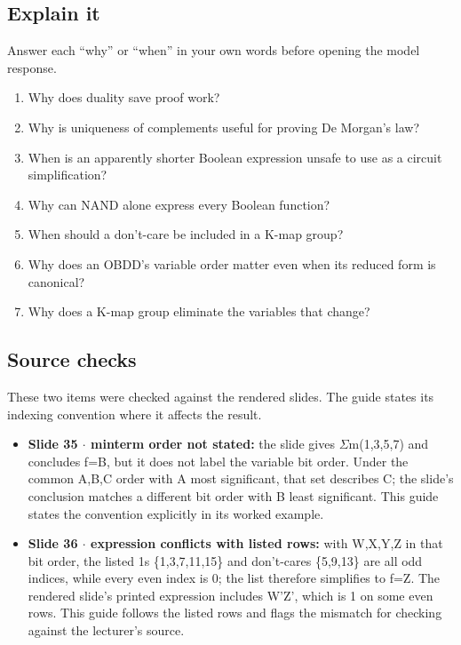 \documentclass[11pt]{article}
\begin{document}
\begin{keepsection}
\section{Explain it}

Answer each “why” or “when” in your own words before opening the model response.

\begin{enumerate}
\item Why does duality save proof work?
\item Why is uniqueness of complements useful for proving De Morgan’s law?
\item When is an apparently shorter Boolean expression unsafe to use as a circuit simplification?
\item Why can NAND alone express every Boolean function?
\item When should a don’t-care be included in a K-map group?
\item Why does an OBDD’s variable order matter even when its reduced form is canonical?
\item Why does a K-map group eliminate the variables that change?
\end{enumerate}

\end{keepsection}

\begin{keepsection}
\section{Source checks}

These two items were checked against the rendered slides. The guide states its indexing convention where it affects the result.

\begin{itemize}
\item \textbf{Slide 35 \ensuremath{\cdot} minterm order not stated:} the slide gives \ensuremath{\Sigma}m(1,3,5,7) and concludes f=B, but it does not label the variable bit order. Under the common A,B,C order with A most significant, that set describes C; the slide’s conclusion matches a different bit order with B least significant. This guide states the convention explicitly in its worked example.
\item \textbf{Slide 36 \ensuremath{\cdot} expression conflicts with listed rows:} with W,X,Y,Z in that bit order, the listed 1s \{1,3,7,11,15\} and don’t-cares \{5,9,13\} are all odd indices, while every even index is 0; the list therefore simplifies to f=Z. The rendered slide’s printed expression includes W'Z', which is 1 on some even rows. This guide follows the listed rows and flags the mismatch for checking against the lecturer’s source.
\end{itemize}
\end{keepsection}
\end{document}
